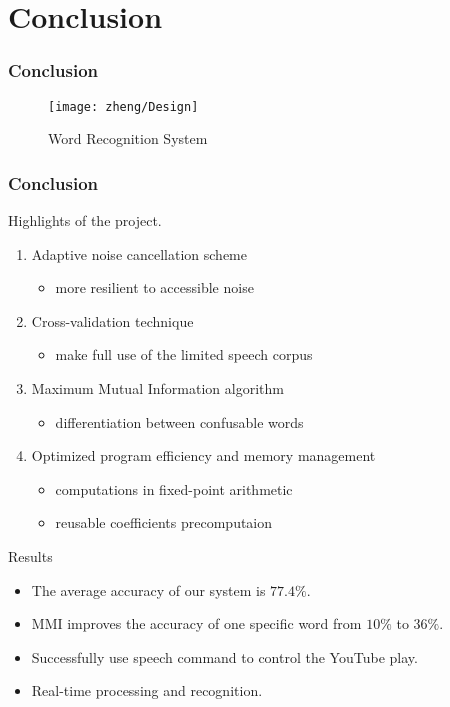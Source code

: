 \section{Conclusion}

\begin{frame}
\frametitle{Conclusion}
\begin{figure}[H]
\begin{center}
\texttt{[image: zheng/Design]} 
\caption{Word Recognition System}
\end{center}
\end{figure}
\end{frame}

\begin{frame}
\frametitle{Conclusion}
Highlights of the project.
\begin{enumerate}
	\item Adaptive noise cancellation scheme
	\begin{itemize}
		\item more resilient to accessible noise
	\end{itemize}
	\item Cross-validation technique
	\begin{itemize}
		\item make full use of the limited speech corpus
	\end{itemize}
	\item Maximum Mutual Information algorithm
	\begin{itemize}
		\item differentiation between confusable words
	\end{itemize}
	\item Optimized program efficiency and memory management
	\begin{itemize}
		\item computations in fixed-point arithmetic
		\item reusable coefficients precomputaion
	\end{itemize}
\end{enumerate}
\end{frame}

\begin{frame}
\begin{block}{Results}
\begin{itemize}
	\item The average accuracy of our system is $77.4\%$.
	\item MMI improves the accuracy of one specific word from $10\%$ to $36\%$.
	\item Successfully use speech command to control the YouTube play.
	\item Real-time processing and recognition.
\end{itemize}
\end{block}
\end{frame}

